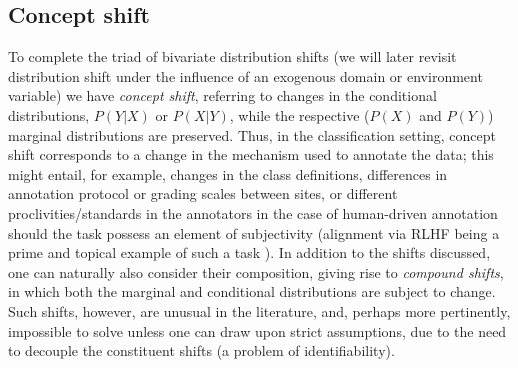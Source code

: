 \subsection{Concept shift}\label{ssec:concept-shift}
To complete the triad of bivariate distribution shifts (we will later revisit distribution shift
under the influence of an exogenous domain or environment variable) we have \emph{concept shift},
referring to changes in the conditional distributions, \( P(Y|X) \) or \( P(X|Y) \), while the
respective (\( P(X) \) and \( P(Y) \)) marginal distributions are preserved.
%
Thus, in the classification setting, concept shift corresponds to a change in the mechanism used to
annotate the data; this might entail, for example, changes in the class definitions, differences in
annotation protocol or grading scales between sites,  or different proclivities/standards in the
annotators in the case of human-driven annotation should the task possess an element of
subjectivity (alignment via \ac{RLHF} being a prime and topical example of such a task
\citep{bai2022training}).
%
In addition to the shifts discussed, one can naturally also consider their composition, giving rise
to \emph{compound shifts}, in which both the marginal and conditional distributions are subject to
change. Such shifts, however, are unusual in the literature, and, perhaps more pertinently,
impossible to solve unless one can draw upon strict assumptions, due to the need to decouple the
constituent shifts (a problem of identifiability).
%

